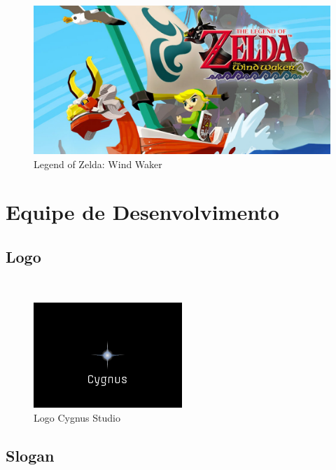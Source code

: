 \begin{figure}[!htb] \caption{\label{fig_zelda}Legend of Zelda: Wind Waker} \begin{center}
\includegraphics[width=\textwidth]{imagens/windwaker.jpeg} \end{center}
 \end{figure}

\clearpage

\section{Equipe de Desenvolvimento}

\subsection{Logo}

~

\begin{figure}[!htb] \caption{\label{fig_logo}Logo Cygnus Studio} \begin{center}
\includegraphics[width=0.5\textwidth]{imagens/logo.png}\end{center}
 \end{figure}

\subsection{Slogan}

